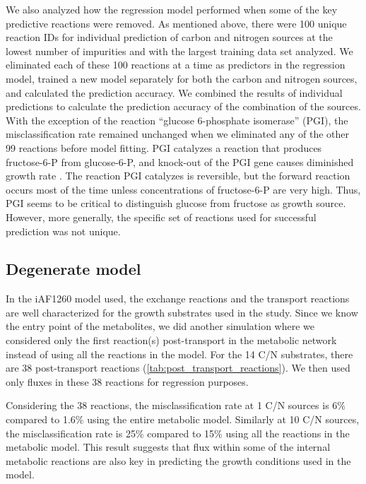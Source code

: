 \documentclass[12pt]{article}
\begin{document}
We also analyzed how the regression model performed when some of the key predictive reactions were removed. As mentioned above, there were 100 unique reaction IDs for individual prediction of carbon and nitrogen sources at the lowest number of impurities and with the largest training data set analyzed. We eliminated each of these 100 reactions at a time as predictors in the regression model, trained a new model separately for both the carbon and nitrogen sources, and calculated the prediction accuracy. We combined the results of individual predictions to calculate the prediction accuracy of the combination of the sources. With the exception of the reaction ``glucose 6-phosphate isomerase'' (PGI), the misclassification rate remained unchanged when we eliminated any of the other 99 reactions before model fitting. PGI catalyzes a reaction that produces fructose-6-P from glucose-6-P, and knock-out of the PGI gene causes diminished growth rate \cite{Canonacoetal2001}. The reaction PGI catalyzes is reversible, but the forward reaction occurs most of the time unless concentrations of fructose-6-P are very high. Thus, PGI seems to be critical to distinguish glucose from fructose as growth source. However, more generally, the specific set of reactions used for successful prediction was not unique.

\subsection{Degenerate model}
In the iAF1260 model used, the exchange reactions and the transport reactions are well characterized for the growth substrates used in the study. Since we know the entry point of the metabolites, we did another simulation where we considered only the first reaction(s) post-transport in the metabolic network instead of using all the reactions in the model. For the 14 C/N substrates, there are 38 post-transport reactions (\ref{tab:post_transport_reactions}). We then used only fluxes in these 38 reactions for regression purposes. 

Considering the 38 reactions, the misclassification rate at 1 C/N sources is 6\% compared to 1.6\% using the entire metabolic model. Similarly at 10 C/N sources, the misclassification rate is 25\% compared to 15\% using all the reactions in the metabolic model. This result suggests that flux within some of the internal metabolic reactions are also key in predicting the growth conditions used in the model. 
\end{document}
